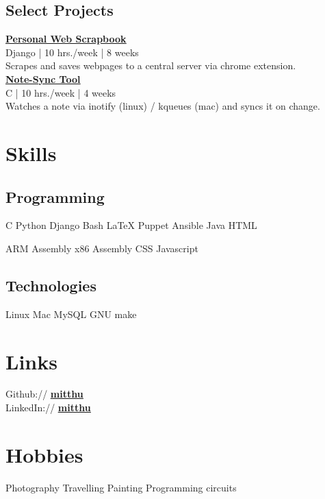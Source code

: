 \documentclass[]{deedy}
\newcommand{\linkstyle}[1]{\textbf{\ul{#1}}}
\let\oldhref\href
\renewcommand{\href}[2]{%
\oldhref{#1}{\linkstyle{#2}}%
}
\begin{document}
\begin{minipage}[t]{0.33\textwidth}
\subsection{Select Projects}
\href{https://bitbucket.org/mitthu/capsule/src/}{Personal Web Scrapbook}\\
{\small Django | 10 hrs./week | 8 weeks}\\[0.4ex]
Scrapes and saves webpages to a central server via chrome extension.\\[1.5ex]

\href{https://github.com/mitthu/note-sync}{Note-Sync Tool}\\
{\small C | 10 hrs./week | 4 weeks}\\[0.4ex]
Watches a note via inotify (linux) / kqueues (mac) and syncs it on change.

\section{Skills}
\subsection{Programming}
C \textbullet{} Python \textbullet{} Django \textbullet{} Bash \textbullet{} \LaTeX \textbullet{} Puppet \textbullet{} Ansible \textbullet{} Java \textbullet{} HTML
\sectionsep

ARM Assembly \textbullet{} x86 Assembly \textbullet{} CSS \textbullet{} Javascript
\sectionsep

\subsection{Technologies}
Linux \textbullet{} Mac \textbullet{} MySQL \textbullet{} GNU make

\section{Links} 
Github:// \href{https://github.com/mitthu}{mitthu} \\
LinkedIn://  \href{https://www.linkedin.com/in/mitthu}{mitthu}

\section{Hobbies}
Photography \textbullet{} Travelling \textbullet{} Painting \textbullet{} Programming circuits

\end{minipage} \hfill
\end{document}
